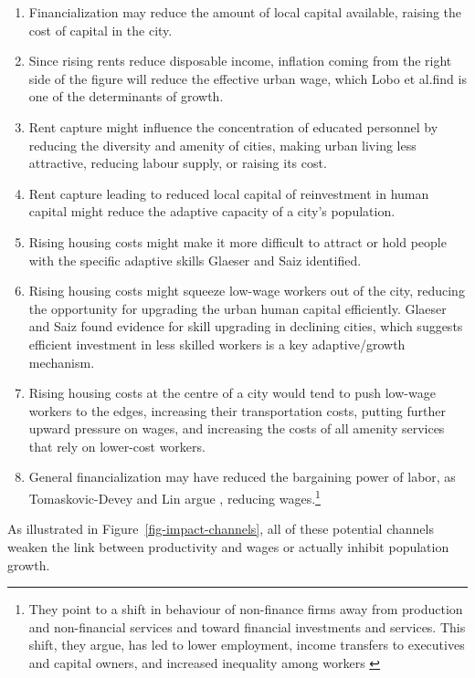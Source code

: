 \begin{enumerate}
\item Financialization may reduce the amount of local capital available, raising the cost of capital in the city. 
    
\item Since rising rents reduce disposable income, inflation coming from the right side of the figure will reduce the effective urban wage, which Lobo et al.find is one of the determinants of growth.

\item Rent capture might influence the concentration of educated personnel by reducing the diversity and amenity of cities, making urban living less attractive, reducing labour supply, or raising its cost.

\item Rent capture leading to reduced local capital of reinvestment in human capital might reduce the adaptive capacity of a city's population.

\item Rising housing costs might make it more difficult to attract or hold people with the specific adaptive skills Glaeser and Saiz identified.

\item  Rising housing costs might squeeze low-wage workers out of the city, reducing the opportunity for upgrading the urban human capital efficiently. Glaeser and Saiz found evidence for skill upgrading in declining cities, which suggests efficient investment in less skilled workers is a key adaptive/growth mechanism. 

\item Rising housing costs at the centre of a city would tend to push low-wage workers to the edges, increasing their transportation costs, putting further upward pressure on wages, and increasing the costs of all amenity services that rely on lower-cost workers.

\item General financialization may have reduced the bargaining power of labor, as Tomaskovic-Devey and Lin argue \cite{tomaskovic-deveyFinancializationCausesInequality2013}, reducing wages.\footnote{They point to a shift in behaviour of non-finance firms away from production and non-financial services and toward financial investments and services. This shift, they argue,  has led to lower employment, income transfers to executives and capital owners, and increased inequality among workers \cite{tomaskovic-deveyFinancializationCausesInequality2013}}
\end{enumerate}
As illustrated in Figure~\ref{fig-impact-channels}, all of these potential channels weaken the link between productivity and wages or actually inhibit population growth.



